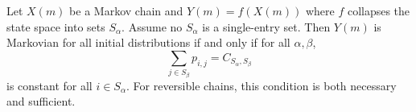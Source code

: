 Let $X(m)$ be a Markov chain and $Y(m) = f(X(m))$ where $f$ collapses the state space into sets $S_\alpha$. Assume no $S_\alpha$ is a single-entry set. Then $Y(m)$ is Markovian for all initial distributions if and only if for all $\alpha, \beta$,
$$\sum_{j \in S_\beta} p_{i,j} = C_{S_\alpha, S_\beta}$$
is constant for all $i \in S_\alpha$. For reversible chains, this condition is both necessary and sufficient.
